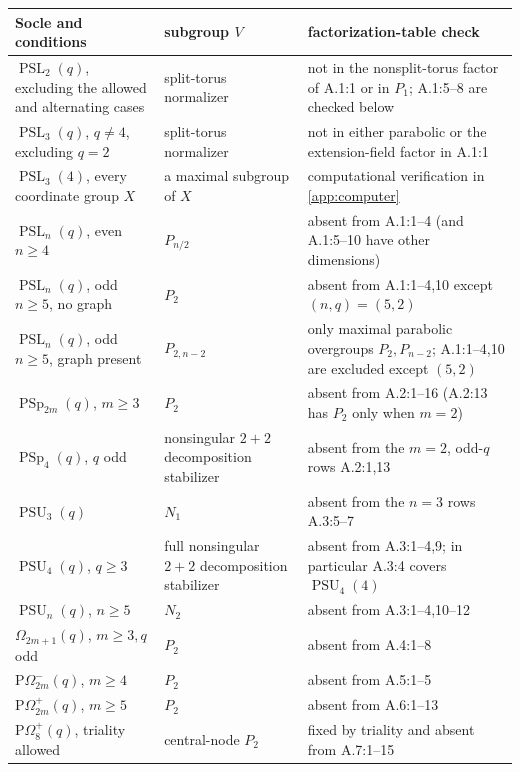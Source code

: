 \documentclass[11pt]{amsart}
\newcommand{\PSL}{\operatorname{PSL}}
\newcommand{\PSU}{\operatorname{PSU}}
\newcommand{\PSp}{\operatorname{PSp}}
\theoremstyle{definition}
\begin{document}
\begin{longtable}{>{\raggedright\arraybackslash}p{}
                  >{\raggedright\arraybackslash}p{}
                  >{\raggedright\arraybackslash}p{}}
\toprule
Socle and conditions & subgroup \(V\) & factorization-table check \\
\midrule
\endhead
\(\PSL_2(q)\), excluding the allowed and alternating cases
& split-torus normalizer
& not in the nonsplit-torus factor of A.1:1 or in \(P_1\); A.1:5--8 are
checked below \\
\(\PSL_3(q)\), \(q\ne4\), excluding \(q=2\)
& split-torus normalizer
& not in either parabolic or the extension-field factor in A.1:1 \\
\(\PSL_3(4)\), every coordinate group \(X\)
& a maximal subgroup of \(X\)
& computational verification in \cref{app:computer} \\
\(\PSL_n(q)\), even \(n\ge4\)
& \(P_{n/2}\)
& absent from A.1:1--4 (and A.1:5--10 have other dimensions) \\
\(\PSL_n(q)\), odd \(n\ge5\), no graph
& \(P_2\)
& absent from A.1:1--4,10 except \((n,q)=(5,2)\) \\
\(\PSL_n(q)\), odd \(n\ge5\), graph present
& \(P_{2,n-2}\)
& only maximal parabolic overgroups \(P_2,P_{n-2}\); A.1:1--4,10 are
excluded except \((5,2)\) \\
\(\PSp_{2m}(q)\), \(m\ge3\)
& \(P_2\)
& absent from A.2:1--16 (A.2:13 has \(P_2\) only when \(m=2\)) \\
\(\PSp_4(q)\), \(q\) odd
& nonsingular \(2+2\) decomposition stabilizer
& absent from the \(m=2\), odd-\(q\) rows A.2:1,13 \\
\(\PSU_3(q)\)
& \(N_1\)
& absent from the \(n=3\) rows A.3:5--7 \\
\(\PSU_4(q)\), \(q\ge3\)
& full nonsingular \(2+2\) decomposition stabilizer
& absent from A.3:1--4,9; in particular A.3:4 covers \(\PSU_4(4)\) \\
\(\PSU_n(q)\), \(n\ge5\)
& \(N_2\)
& absent from A.3:1--4,10--12 \\
\(\Omega_{2m+1}(q)\), \(m\ge3, q\) odd
& \(P_2\)
& absent from A.4:1--8 \\
\(\mathrm P\Omega^-_{2m}(q)\), \(m\ge4\)
& \(P_2\)
& absent from A.5:1--5 \\
\(\mathrm P\Omega^+_{2m}(q)\), \(m\ge5\)
& \(P_2\)
& absent from A.6:1--13 \\
\(\mathrm P\Omega^+_8(q)\), triality allowed
& central-node \(P_2\)
& fixed by triality and absent from A.7:1--15 \\
\bottomrule
\end{longtable}
\end{document}
